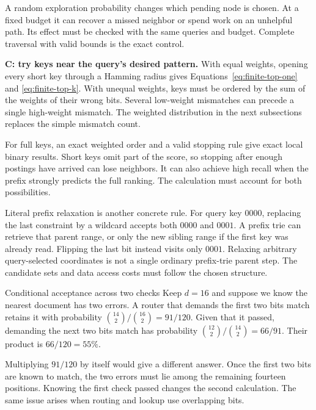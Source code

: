 A random exploration probability changes which pending node is chosen. At a fixed budget it
can recover a missed neighbor or spend work on an unhelpful path. Its effect must be checked
with the same queries and budget. Complete traversal with valid bounds is the exact control.

\textbf{C: try keys near the query's desired pattern.} With equal weights, opening every short
key through a Hamming radius gives Equations~\eqref{eq:finite-top-one} and
\eqref{eq:finite-top-k}. With unequal weights, keys must be ordered by the sum of the weights
of their wrong bits. Several low-weight mismatches can precede a single high-weight mismatch.
The weighted distribution in the next subsections replaces the simple mismatch count.

For full keys, an exact weighted order and a valid stopping rule give exact local binary
results. Short keys omit part of the score, so stopping after enough postings have arrived can
lose neighbors. It can also achieve high recall when the prefix strongly predicts the full ranking.
The calculation must account for both possibilities.

Literal prefix relaxation is another concrete rule. For query key $0000$, replacing the last
constraint by a wildcard accepts both $0000$ and $0001$. A prefix trie can retrieve that parent
range, or only the new sibling range if the first key was already read. Flipping the last bit
instead visits only $0001$. Relaxing arbitrary query-selected coordinates is not a single
ordinary prefix-trie parent step. The candidate sets and data access costs must follow the
chosen structure.

\begin{examplebox}{Conditional acceptance across two checks}
Keep $d=16$ and suppose we know the nearest document has two errors. A router that demands the
first two bits match retains it with probability $\binom{14}{2}/\binom{16}{2}=91/120$.
Given that it passed, demanding the next two bits match has probability
$\binom{12}{2}/\binom{14}{2}=66/91$. Their product is $66/120=55\%$.

Multiplying $91/120$ by itself would give a different answer. Once the first two bits are known
to match, the two errors must lie among the remaining fourteen positions. Knowing the first check passed changes
the second calculation. The same issue arises when routing and lookup use overlapping bits.
\end{examplebox}

